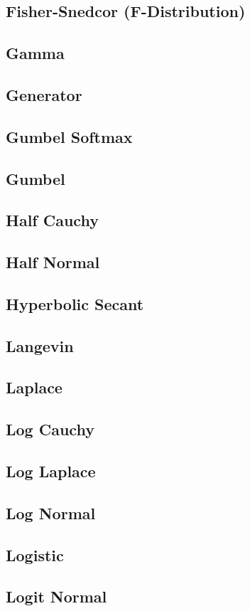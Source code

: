 \documentclass{article}
\begin{document}
\subsection{Fisher-Snedcor (F-Distribution)}
\subsection{Gamma}
\subsection{Generator}
\subsection{Gumbel Softmax}
\subsection{Gumbel}
\subsection{Half Cauchy}
\subsection{Half Normal}
\subsection{Hyperbolic Secant}
\subsection{Langevin}
\subsection{Laplace}
\subsection{Log Cauchy}
\subsection{Log Laplace}
\subsection{Log Normal}
\subsection{Logistic}
\subsection{Logit Normal}
\end{document}
